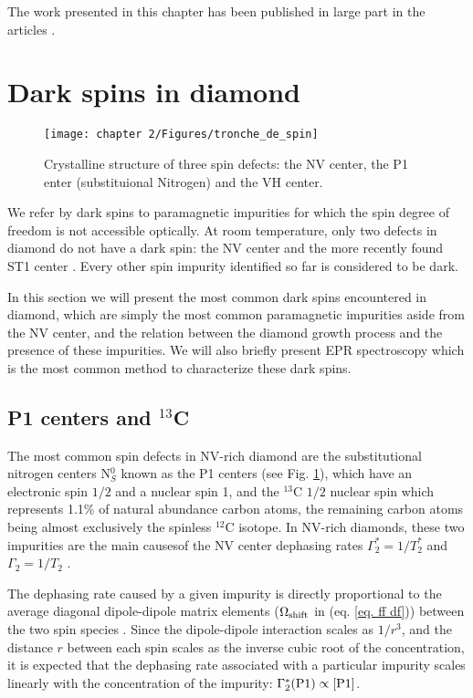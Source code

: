 \documentclass[a4paper, 11pt]{report}
\begin{document}
The work presented in this chapter has been published in large part in the articles \citep{pellet2021optical, ngambou2022improving}.


\section{Dark spins in diamond}

\begin{figure}[h!]
\centering
\texttt{[image: chapter 2/Figures/tronche\_de\_spin]}
\caption{Crystalline structure of three spin defects: the NV center, the P1 enter (substituional Nitrogen) and the VH center.} 
\label{repr NV P1 VH}
\end{figure}

We refer by dark spins to paramagnetic impurities for which the spin degree of freedom is not accessible optically. At room temperature, only two defects in diamond do not have a dark spin: the NV center and the more recently found ST1 center \citep{lee2013readout, john2017bright}. Every other spin impurity identified so far is considered to be dark.

In this section we will present the most common dark spins encountered in diamond, which are simply the most common paramagnetic impurities aside from the NV center, and the relation between the diamond growth process and the presence of these impurities. We will also briefly present EPR spectroscopy which is the most common method to characterize these dark spins.

\subsection{P1 centers and $^{13}$C}
The most common spin defects in NV-rich diamond are the substitutional nitrogen centers N$^0_S$ known as the P1 centers (see Fig. \ref{repr NV P1 VH}), which have an electronic spin $1/2$ and a nuclear spin 1, and the $^{13}$C $1/2$ nuclear spin which represents 1.1\% of natural abundance carbon atoms, the remaining carbon atoms being almost exclusively the spinless $^{12}$C isotope. In NV-rich diamonds, these two impurities are the main causesof the NV center dephasing rates $\Gamma_2^*=1/T_2^*$ and $\Gamma_2=1/T_2$  \citep{barry2020sensitivity}. 

The dephasing rate caused by a given impurity is directly proportional to the average diagonal dipole-dipole matrix elements ($\Omega_{\rm shift}$ in (eq. \ref{eq. ff df})) between the two spin species \citep{taylor2008high, bauch2020decoherence}. Since the dipole-dipole interaction scales as $1/r^3$, and the distance $r$ between each spin scales as the inverse cubic root of the concentration,  it is expected that the dephasing rate associated with a particular impurity scales linearly with the concentration of the impurity: $\Gamma_2^*(\rm P1) \propto [P1]$. 
\end{document}
